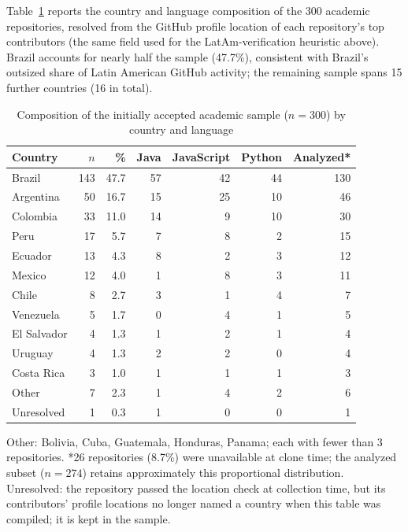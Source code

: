 \documentclass{cleiej}
\begin{document}
Table~\ref{tab:country} reports the country and language composition of the 300 academic repositories, resolved from the GitHub profile location of each repository's top contributors (the same field used for the LatAm-verification heuristic above). Brazil accounts for nearly half the sample (47.7\%), consistent with Brazil's outsized share of Latin American GitHub activity; the remaining sample spans 15 further countries (16 in total).

\begin{table}[h]
\centering
\caption{Composition of the initially accepted academic sample ($n=300$) by country and language}
\label{tab:country}
\begin{tabular}{lrrrrrr}
\toprule
Country & $n$ & \% & Java & JavaScript & Python & Analyzed* \\
\midrule
Brazil       & 143 & 47.7 & 57 & 42 & 44 & 130 \\
Argentina    & 50  & 16.7 & 15 & 25 & 10 & 46 \\
Colombia     & 33  & 11.0 & 14 & 9  & 10 & 30 \\
Peru         & 17  & 5.7  & 7  & 8  & 2  & 15 \\
Ecuador      & 13  & 4.3  & 8  & 2  & 3  & 12 \\
Mexico       & 12  & 4.0  & 1  & 8  & 3  & 11 \\
Chile        & 8   & 2.7  & 3  & 1  & 4  & 7 \\
Venezuela    & 5   & 1.7  & 0  & 4  & 1  & 5 \\
El Salvador  & 4   & 1.3  & 1  & 2  & 1  & 4 \\
Uruguay      & 4   & 1.3  & 2  & 2  & 0  & 4 \\
Costa Rica   & 3   & 1.0  & 1  & 1  & 1  & 3 \\
Other        & 7   & 2.3  & 1  & 4  & 2  & 6 \\
Unresolved   & 1   & 0.3  & 1  & 0  & 0  & 1 \\
\bottomrule
\end{tabular}

\smallskip
\footnotesize Other: Bolivia, Cuba, Guatemala, Honduras, Panama; each with fewer than 3 repositories. *26 repositories (8.7\%) were unavailable at clone time; the analyzed subset ($n=274$) retains approximately this proportional distribution. Unresolved: the repository passed the location check at collection time, but its contributors' profile locations no longer named a country when this table was compiled; it is kept in the sample.
\end{table}
\end{document}
